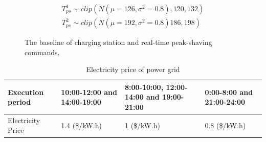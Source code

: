 \documentclass[preprint,12pt]{elsarticle}
\begin{document}
\begin{equation}
\begin{array}{c}
T_{ps}^{1}\sim clip(N(\mu=126,\sigma^{2}=0.8),120,132)\\
T_{ps}^{2}\sim clip(N(\mu=192,\sigma^{2}=0.8)186,198)
\end{array}\label{eq:start_time_ps}
\end{equation}

\begin{figure}[hp]
    \centering
    \hfill %
    \caption{The baseline of charging station and real-time peak-shaving commands. }
    \label{fig:Baseline_and_Orders}
\end{figure}
\begin{table}[thp]
\caption{Electricity price of power grid}
\label{tab:TOU-TARIFF}
\noindent \centering{}%
\begin{tabular}{>{\centering}m{}>{\raggedleft}m{}>{\raggedleft}m{}>{\raggedleft}m{}}
\hline
Execution period  & \raggedleft{}10:00-12:00 and 14:00-19:00 & \raggedleft{}8:00-10:00, 12:00-14:00 and 19:00-21:00 & \raggedleft{}0:00-8:00 and 21:00-24:00\tabularnewline
\hline
Electricity Price
& \raggedleft{}1.4 (\$/kW.h)  & \raggedleft{}1 (\$/kW.h)  & \raggedleft{}0.8 (\$/kW.h) \tabularnewline
\hline
\end{tabular}
\end{table}
\end{document}
